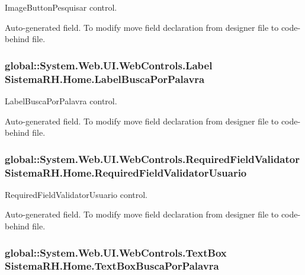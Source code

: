 ImageButtonPesquisar control. 

Auto-\/generated field. To modify move field declaration from designer file to code-\/behind file. \hypertarget{class_sistema_r_h_1_1_home_a46f42efda91d1c0554524de498dee67f}{
\subsubsection[{LabelBuscaPorPalavra}]{\setlength{\rightskip}{0pt plus 5cm}global::System.Web.UI.WebControls.Label {\bf SistemaRH.Home.LabelBuscaPorPalavra}}}
\label{class_sistema_r_h_1_1_home_a46f42efda91d1c0554524de498dee67f}


LabelBuscaPorPalavra control. 

Auto-\/generated field. To modify move field declaration from designer file to code-\/behind file. \hypertarget{class_sistema_r_h_1_1_home_a263e0b47124122368f614ad28bb3c88b}{
\subsubsection[{RequiredFieldValidatorUsuario}]{\setlength{\rightskip}{0pt plus 5cm}global::System.Web.UI.WebControls.RequiredFieldValidator {\bf SistemaRH.Home.RequiredFieldValidatorUsuario}}}
\label{class_sistema_r_h_1_1_home_a263e0b47124122368f614ad28bb3c88b}


RequiredFieldValidatorUsuario control. 

Auto-\/generated field. To modify move field declaration from designer file to code-\/behind file. \hypertarget{class_sistema_r_h_1_1_home_ae00e2dc131501fa120640462ce2d7c04}{
\subsubsection[{TextBoxBuscaPorPalavra}]{\setlength{\rightskip}{0pt plus 5cm}global::System.Web.UI.WebControls.TextBox {\bf SistemaRH.Home.TextBoxBuscaPorPalavra}}}
\label{class_sistema_r_h_1_1_home_ae00e2dc131501fa120640462ce2d7c04}


